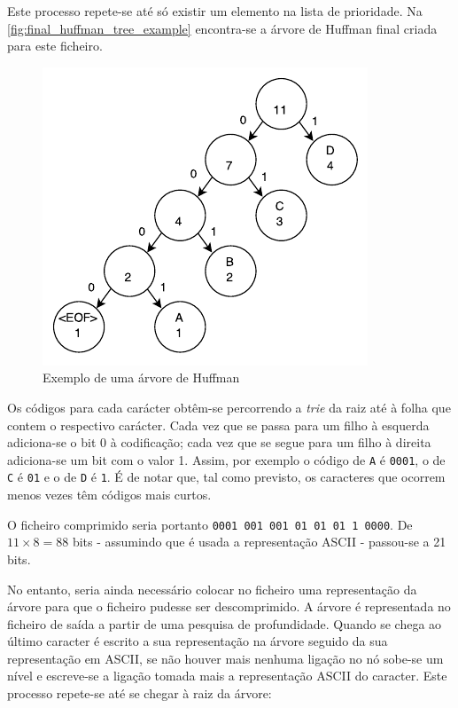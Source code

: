Este processo repete-se até só existir um elemento na lista de prioridade. Na \autoref{fig:final_huffman_tree_example} encontra-se a árvore de Huffman final criada para este ficheiro.

\begin{figure}[H]
  \centering
  \includegraphics[width=.65\textwidth]{img/huffman_tree_example}
  \caption{Exemplo de uma árvore de Huffman}
  \label{fig:final_huffman_tree_example}
\end{figure}

Os códigos para cada carácter obtêm-se percorrendo a \textit{trie} da raiz até à folha que contem o respectivo carácter. Cada vez que se passa para um filho à esquerda adiciona-se o bit 0 à codificação; cada vez que se segue para um filho à direita adiciona-se um bit com o valor 1. Assim, por exemplo o código de \texttt{A} é \texttt{0001}, o de \texttt{C} é \texttt{01} e o de \texttt{D} é \texttt{1}. É de notar que, tal como previsto, os caracteres que ocorrem menos vezes têm códigos mais curtos.

O ficheiro comprimido seria portanto \texttt{0001 001 001 01 01 01 1 0000}. De $11 \times 8 = 88$ bits - assumindo que é usada a representação ASCII - passou-se a 21 bits.

No entanto, seria ainda necessário colocar no ficheiro uma representação da árvore para que o ficheiro pudesse ser descomprimido. A árvore é representada no ficheiro de saída a partir de uma pesquisa de profundidade. Quando se chega ao último caracter é escrito a sua representação na árvore seguido da sua representação em ASCII, se não houver mais nenhuma ligação no nó sobe-se um nível e escreve-se a ligação tomada mais a representação ASCII do caracter. Este processo repete-se até se chegar à raiz da árvore: \\[5mm]
 \par
\vspace{5mm}

